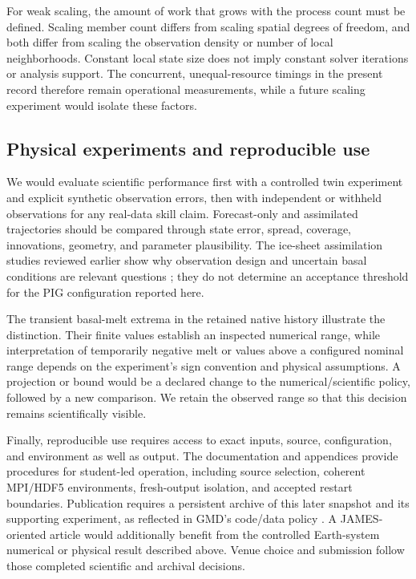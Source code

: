\documentclass[11pt,a4paper]{article}
\begin{document}
For weak scaling, the amount of work that grows with the process count must be defined. Scaling member count differs from scaling spatial degrees of freedom, and both differ from scaling the observation density or number of local neighborhoods. Constant local state size does not imply constant solver iterations or analysis support. The concurrent, unequal-resource timings in the present record therefore remain operational measurements, while a future scaling experiment would isolate these factors.

\subsection{Physical experiments and reproducible use}
We would evaluate scientific performance first with a controlled twin experiment and explicit synthetic observation errors, then with independent or withheld observations for any real-data skill claim. Forecast-only and assimilated trajectories should be compared through state error, spread, coverage, innovations, geometry, and parameter plausibility. The ice-sheet assimilation studies reviewed earlier show why observation design and uncertain basal conditions are relevant questions \citep{bonan2014,gilletchaulet2020,choi2025}; they do not determine an acceptance threshold for the PIG configuration reported here.

The transient basal-melt extrema in the retained native history illustrate the distinction. Their finite values establish an inspected numerical range, while interpretation of temporarily negative melt or values above a configured nominal range depends on the experiment's sign convention and physical assumptions. A projection or bound would be a declared change to the numerical/scientific policy, followed by a new comparison. We retain the observed range so that this decision remains scientifically visible.

Finally, reproducible use requires access to exact inputs, source, configuration, and environment as well as output. The documentation and appendices provide procedures for student-led operation, including source selection, coherent MPI/HDF5 environments, fresh-output isolation, and accepted restart boundaries. Publication requires a persistent archive of this later snapshot and its supporting experiment, as reflected in GMD's code/data policy \citep{gmdpolicy}. A JAMES-oriented article would additionally benefit from the controlled Earth-system numerical or physical result described above. Venue choice and submission follow those completed scientific and archival decisions.
\end{document}
